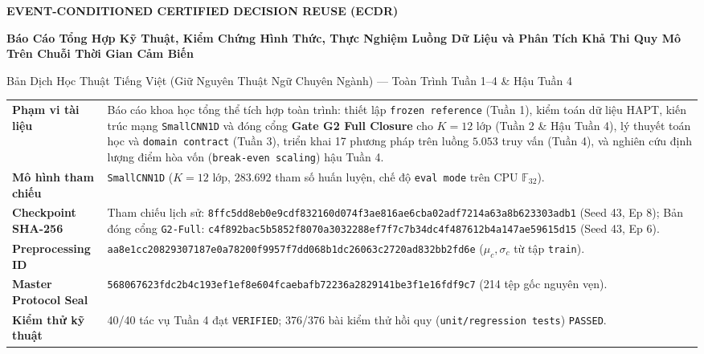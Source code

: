 \documentclass[11pt,a4paper]{article}
\newcommand{\F}{\mathbb{F}}
\newcommand{\code}[1]{{\small\ttfamily\nolinkurl{#1}}}
\theoremstyle{remark}
\begin{document}
\hypersetup{pageanchor=false}
\begin{titlepage}
\vspace*{0.5cm}
{\Large\bfseries\color{teal} EVENT-CONDITIONED CERTIFIED DECISION REUSE (ECDR)\par}
\vspace{0.35cm}
{\huge\bfseries\color{ink} Báo Cáo Tổng Hợp Kỹ Thuật, Kiểm Chứng Hình Thức, Thực Nghiệm Luồng Dữ Liệu và Phân Tích Khả Thi Quy Mô Trên Chuỗi Thời Gian Cảm Biến\par}
\vspace{0.45cm}
{\large\color{ink} Bản Dịch Học Thuật Tiếng Việt (Giữ Nguyên Thuật Ngữ Chuyên Ngành) --- Toàn Trình Tuần 1--4 \& Hậu Tuần 4\par}
\vspace{0.6cm}

\begin{tabularx}{\linewidth}{@{}P{3.7cm}Y@{}}
\toprule
\textbf{Phạm vi tài liệu} & Báo cáo khoa học tổng thể tích hợp toàn trình: thiết lập \code{frozen reference} (Tuần 1), kiểm toán dữ liệu HAPT, kiến trúc mạng \code{SmallCNN1D} và đóng cổng \textbf{Gate G2 Full Closure} cho $K=12$ lớp (Tuần 2 \& Hậu Tuần 4), lý thuyết toán học và \code{domain contract} (Tuần 3), triển khai 17 phương pháp trên luồng $5.053$ truy vấn (Tuần 4), và nghiên cứu định lượng điểm hòa vốn (\code{break-even scaling}) hậu Tuần 4.\\
\textbf{Mô hình tham chiếu} & \code{SmallCNN1D} ($K=12$ lớp, $283.692$ tham số huấn luyện, chế độ \code{eval mode} trên CPU $\F_{32}$).\\
\textbf{Checkpoint SHA-256} & Tham chiếu lịch sử: \code{8ffc5dd8eb0e9cdf832160d074f3ae816ae6cba02adf7214a63a8b623303adb1} (Seed 43, Ep 8); Bản đóng cổng \code{G2-Full}: \code{c4f892bac5b5852f8070a3032288ef7f7c7b34dc4f487612b4a147ae59615d15} (Seed 43, Ep 6).\\
\textbf{Preprocessing ID} & \code{aa8e1cc20829307187e0a78200f9957f7dd068b1dc26063c2720ad832bb2fd6e} ($\mu_c, \sigma_c$ từ tập \code{train}).\\
\textbf{Master Protocol Seal} & \code{568067623fdc2b4c193ef1ef8e604fcaebafb72236a2829141be3f1e16fdf9c7} (214 tệp gốc nguyên vẹn).\\
\textbf{Kiểm thử kỹ thuật} & 40/40 tác vụ Tuần 4 đạt \code{VERIFIED}; 376/376 bài kiểm thử hồi quy (\code{unit/regression tests}) \code{PASSED}.\\
\bottomrule
\end{tabularx}


\end{titlepage}
\end{document}
